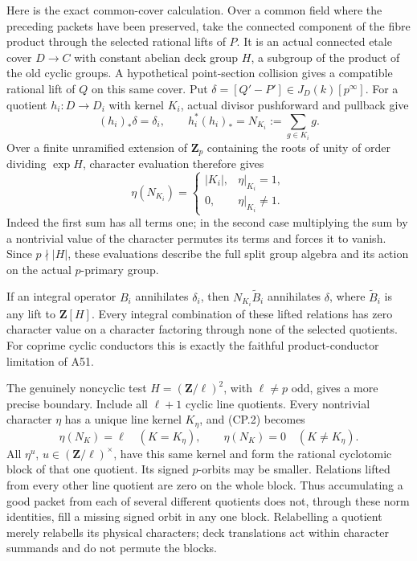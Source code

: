 \documentclass[11pt,a4paper]{article}
\begin{document}
Here is the exact common-cover calculation. Over a common field
where the preceding packets have been preserved, take the connected
component of the fibre product through the selected rational lifts
of $P$. It is an actual connected etale cover $D\to C$ with
constant abelian deck group $H$, a subgroup of the product of the
old cyclic groups. A hypothetical point-section collision gives a
compatible rational lift of $Q$ on this same cover. Put
$\delta=[Q'-P']\in J_D(k)[p^\infty]$. For a quotient
$h_i:D\to D_i$ with kernel $K_i$, actual divisor pushforward and
pullback give
\[
 (h_i)_*\delta=\delta_i,\qquad
 h_i^*(h_i)_*=N_{K_i}:=\sum_{g\in K_i}g.
\tag{CP.1}
\]
Over a finite unramified extension of $\mathbf Z_p$ containing
the roots of unity of order dividing $\exp H$, character evaluation
therefore gives
\[
 \eta(N_{K_i})=
 \begin{cases}
 |K_i|,&\eta|_{K_i}=1,\\
 0,&\eta|_{K_i}\ne1.
 \end{cases}
\tag{CP.2}
\]
Indeed the first sum has all terms one; in the second case
multiplying the sum by a nontrivial value of the character
permutes its terms and forces it to vanish. Since $p\nmid|H|$,
these evaluations describe the full split group algebra and
its action on the actual $p$-primary group.

If an integral operator $B_i$ annihilates $\delta_i$, then
$N_{K_i}\widetilde B_i$ annihilates $\delta$, where
$\widetilde B_i$ is any lift to $\mathbf Z[H]$.
Every integral combination of these lifted relations has zero
character value on a character factoring through none of the
selected quotients. For coprime cyclic conductors this is exactly
the faithful product-conductor limitation of A51.

The genuinely noncyclic test $H=(\mathbf Z/\ell)^2$, with
$\ell\ne p$ odd, gives a more precise boundary. Include all
$\ell+1$ cyclic line quotients. Every nontrivial character $\eta$
has a unique line kernel $K_\eta$, and (CP.2) becomes
\[
 \eta(N_K)=\ell\quad(K=K_\eta),\qquad
 \eta(N_K)=0\quad(K\ne K_\eta).
\tag{CP.3}
\]
All $\eta^u$, $u\in(\mathbf Z/\ell)^\times$, have this same
kernel and form the rational cyclotomic block of that one
quotient. Its signed $p$-orbits may be smaller. Relations lifted
from every other line quotient are zero on the whole block.
Thus accumulating a good packet from each of several different
quotients does not, through these norm identities, fill a missing
signed orbit in any one block. Relabelling a quotient merely
relabells its physical characters; deck translations act within
character summands and do not permute the blocks.
\end{document}
